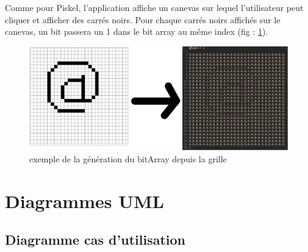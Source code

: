 \documentclass{article}
\begin{document}
	Comme pour Piskel, l'application affiche un canevas sur lequel l'utilisateur peut cliquer et afficher des carrés noirs. Pour chaque carrés noirs affichés sur le canevas, un bit passera un 1 dans le bit array au même index (fig : \ref{fig:canevas_array}). 

	\begin{figure}[!h]
		\centering
		\includegraphics[scale=0.8]{./images/grid-txt.png}
		\caption{exemple de la génération du bitArray depuis la grille}
		\label{fig:canevas_array}
	\end{figure}

	\newpage
	\section{Diagrammes UML}
	\subsection{Diagramme cas d'utilisation}
\end{document}
